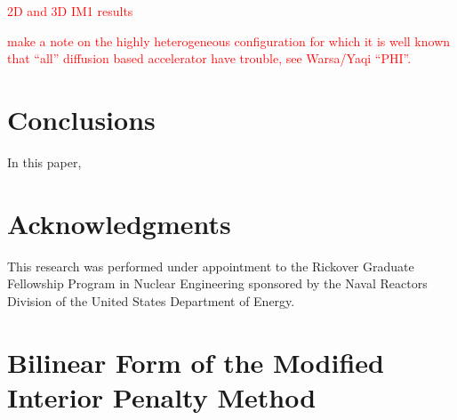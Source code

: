 \documentclass[preprint,10pt]{elsarticle}
\newcommand{\tcr}[1]{\textcolor{red}{#1}}
\begin{document}
\tcr{2D and 3D IM1 results}

\tcr{make a note on the highly heterogeneous configuration for which it is well known that ``all'' diffusion based accelerator have trouble, see Warsa/Yaqi ``PHI''.}
 

\section{Conclusions} \label{sec::conclusions}

In this paper,

\section*{Acknowledgments} 
This research was performed under appointment to the Rickover Graduate Fellowship Program in Nuclear Engineering sponsored by the Naval Reactors Division of the United States Department of Energy.




\appendix
\section{Bilinear Form of the Modified Interior Penalty Method}  \label{app::mip}
\end{document}
